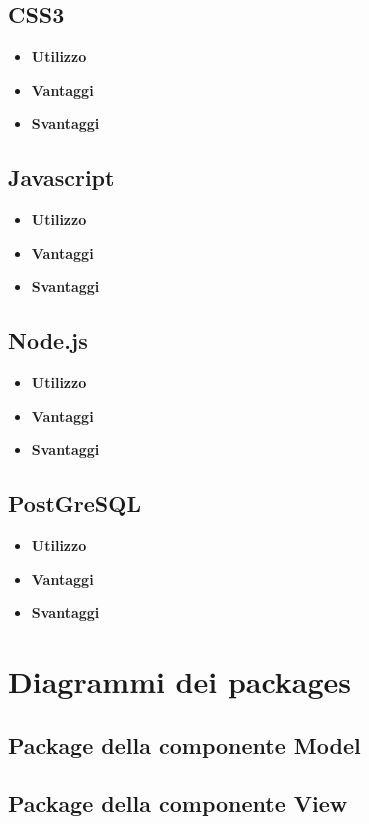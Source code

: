 \documentclass[a4paper,11pt]{article}
\begin{document}
	\subsection{CSS3}
	\begin{itemize}
		\item\textbf{Utilizzo}
		\item\textbf{Vantaggi}
		\item\textbf{Svantaggi}
	\end{itemize}
	\subsection{Javascript}
	\begin{itemize}
		\item\textbf{Utilizzo}
		\item\textbf{Vantaggi}
		\item\textbf{Svantaggi}
	\end{itemize}
	\subsection{Node.js}
	\begin{itemize}
		\item\textbf{Utilizzo}
		\item\textbf{Vantaggi}
		\item\textbf{Svantaggi}
	\end{itemize}
	\subsection{PostGreSQL}
	\begin{itemize}
		\item\textbf{Utilizzo}
		\item\textbf{Vantaggi}
		\item\textbf{Svantaggi}
	\end{itemize}
	
	\section{Diagrammi dei packages}
	\subsection{Package della componente Model}
	\subsection{Package della componente View}
\end{document}
